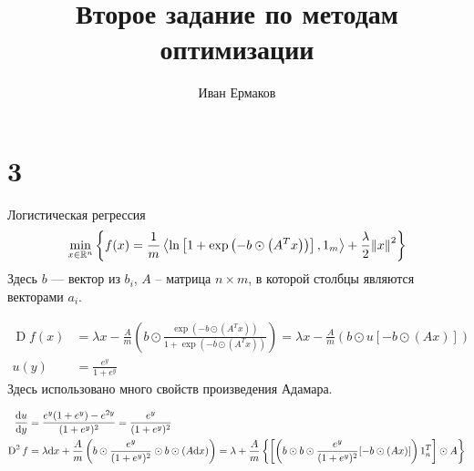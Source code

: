 \documentclass[notitlepage]{article}
\title{Второе задание по методам оптимизации}
\author{Иван Ермаков}
\date{}
\newcommand\inner[2]{\left\langle #1, #2 \right\rangle}
\begin{document}
\maketitle
\section*{3}
Логистическая регрессия
\begin{equation}
  \min_{x \in \mathbb{R}^n} \left\{f(x) = \frac 1m\inner{\ln\left[1 + \exp\left(-b \odot \left(A^T x\right)\right)\right]}{1_m}
  + \frac{\lambda}2 \norm{x}^2\right\}
\end{equation}
Здесь $b$ --- вектор из $b_i$, $A$ -- матрица $n \times m$, в которой столбцы являются векторами $a_i$.

\begin{equation}
  \begin{aligned}
    \operatorname{D} f(x) &= \lambda x - \frac Am\left(b\odot\frac{\exp\left(-b \odot \left(A^T x\right)\right)}
  {1 + \exp\left(-b \odot \left(A^T x\right)\right)}\right) = 
  \lambda x - \frac A m\left(b\odot u\left[-b\odot \left(A x\right)\right]\right)\\
  u(y) &= \frac{e^y}{1 + e^y}
  \end{aligned}
\end{equation}
Здесь использовано много свойств произведения Адамара.

\begin{equation}
  \begin{aligned}
    \dv{u}{y} &= \frac{e^y(1 + e^y) - e^{2y}}{(1 + e^y)^2} = \frac{e^y}{(1 + e^y)^2}\\
    \operatorname{D}^2 f &= \lambda \dd x + \frac Am \left(b\odot \frac{e^y}{(1 + e^y)^2} \odot b \odot \left(A \dd x \right)\right) = 
    \lambda + \frac Am \left\{\left[\left(b \odot b \odot \frac{e^y}{(1 + e^y)^2}[-b \odot (Ax)]\right) 1_n^T\right] \odot A\right\}
  \end{aligned}
\end{equation}
			
\end{document}
